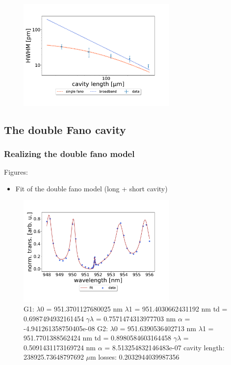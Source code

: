 \begin{figure}[h!]
    \centering
    \includegraphics[width=0.7\textwidth]{figures/results/HWHM_vs_cavity_length_single_fano.pdf}
    \caption{}
    \label{fig:HWHM_vs_time_single_fano_data}
\end{figure}

\subsection{The double Fano cavity}

\subsubsection{Realizing the double fano model}

Figures: 
\begin{itemize}
    \item Fit of the double fano model (long + short cavity)
\end{itemize}

\begin{figure}[h!]
    \centering
    \includegraphics[width=0.7\textwidth]{figures/results/238um_long_scan_fit.pdf}
    \caption{G1: 
    $\lambda$0 =  951.3701127680025 nm 
    $\lambda$1 =  951.4030662431192 nm 
    td =  0.6987494932161454 
    $\gamma \lambda$ =  0.7571474313977703 nm 
    $\alpha$ =  -4.941261358750405e-08
    G2: 
    $\lambda$0 =  951.6390536402713 nm 
    $\lambda$1 =  951.7701388562424 nm 
    td =  0.8980584603164458 
    $\gamma \lambda$ =  0.5091431173169724 nm 
    $\alpha$ =  8.513254832146483e-07
    cavity length:  238925.73648797692 $\mu$m
    losses:  0.2032944039987356}
    \label{fig:238um_long_scan_fit}
\end{figure}

